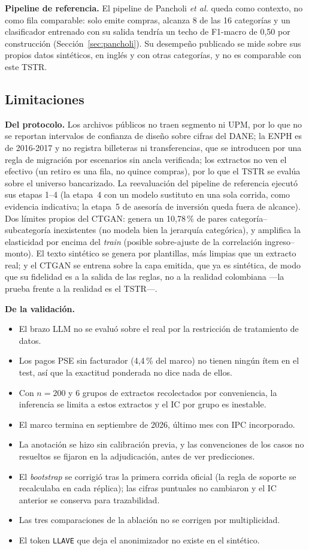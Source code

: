 \documentclass[journal]{IEEEtai}
\begin{document}
\textbf{Pipeline de referencia.} El pipeline de Pancholi \textit{et al.} queda como contexto, no como fila comparable: solo emite compras, alcanza 8 de las 16 categorías y un clasificador entrenado con su salida tendría un techo de F1-macro de 0{,}50 por construcción (Sección~\ref{sec:pancholi}). Su desempeño publicado se mide sobre sus propios datos sintéticos, en inglés y con otras categorías, y no es comparable con este TSTR.

\subsection{Limitaciones}
\textbf{Del protocolo.} Los archivos públicos no traen segmento ni UPM, por lo que no se reportan intervalos de confianza de diseño sobre cifras del DANE; la ENPH es de 2016-2017 y no registra billeteras ni transferencias, que se introducen por una regla de migración por escenarios sin ancla verificada; los extractos no ven el efectivo (un retiro es una fila, no quince compras), por lo que el TSTR se evalúa sobre el universo bancarizado. La reevaluación del pipeline de referencia ejecutó sus etapas 1--4 (la etapa~4 con un modelo sustituto en una sola corrida, como evidencia indicativa; la etapa~5 de asesoría de inversión queda fuera de alcance). Dos límites propios del CTGAN: genera un 10{,}78\,\% de pares categoría--subcategoría inexistentes (no modela bien la jerarquía categórica), y amplifica la elasticidad por encima del \textit{train} (posible sobre-ajuste de la correlación ingreso--monto). El texto sintético se genera por plantillas, más limpias que un extracto real; y el CTGAN se entrena sobre la capa emitida, que ya es sintética, de modo que su fidelidad es a la salida de las reglas, no a la realidad colombiana —la prueba frente a la realidad es el TSTR—.

\textbf{De la validación.}
\begin{itemize}
\item El brazo LLM no se evaluó sobre el real por la restricción de tratamiento de datos.
\item Los pagos PSE sin facturador (4{,}4\,\% del marco) no tienen ningún ítem en el test, así que la exactitud ponderada no dice nada de ellos.
\item Con $n=200$ y 6 grupos de extractos recolectados por conveniencia, la inferencia se limita a estos extractos y el IC por grupo es inestable.
\item El marco termina en septiembre de 2026, último mes con IPC incorporado.
\item La anotación se hizo sin calibración previa, y las convenciones de los casos no resueltos se fijaron en la adjudicación, antes de ver predicciones.
\item El \textit{bootstrap} se corrigió tras la primera corrida oficial (la regla de soporte se recalculaba en cada réplica); las cifras puntuales no cambiaron y el IC anterior se conserva para trazabilidad.
\item Las tres comparaciones de la ablación no se corrigen por multiplicidad.
\item El token \texttt{LLAVE} que deja el anonimizador no existe en el sintético.
\end{itemize}
\end{document}
